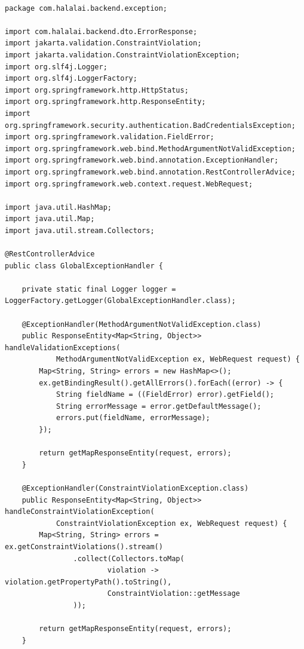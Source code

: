 \begin{lstlisting}[basicstyle=\tiny\ttfamily,breaklines=true]

package com.halalai.backend.exception;

import com.halalai.backend.dto.ErrorResponse;
import jakarta.validation.ConstraintViolation;
import jakarta.validation.ConstraintViolationException;
import org.slf4j.Logger;
import org.slf4j.LoggerFactory;
import org.springframework.http.HttpStatus;
import org.springframework.http.ResponseEntity;
import org.springframework.security.authentication.BadCredentialsException;
import org.springframework.validation.FieldError;
import org.springframework.web.bind.MethodArgumentNotValidException;
import org.springframework.web.bind.annotation.ExceptionHandler;
import org.springframework.web.bind.annotation.RestControllerAdvice;
import org.springframework.web.context.request.WebRequest;

import java.util.HashMap;
import java.util.Map;
import java.util.stream.Collectors;

@RestControllerAdvice
public class GlobalExceptionHandler {

    private static final Logger logger = LoggerFactory.getLogger(GlobalExceptionHandler.class);

    @ExceptionHandler(MethodArgumentNotValidException.class)
    public ResponseEntity<Map<String, Object>> handleValidationExceptions(
            MethodArgumentNotValidException ex, WebRequest request) {
        Map<String, String> errors = new HashMap<>();
        ex.getBindingResult().getAllErrors().forEach((error) -> {
            String fieldName = ((FieldError) error).getField();
            String errorMessage = error.getDefaultMessage();
            errors.put(fieldName, errorMessage);
        });

        return getMapResponseEntity(request, errors);
    }

    @ExceptionHandler(ConstraintViolationException.class)
    public ResponseEntity<Map<String, Object>> handleConstraintViolationException(
            ConstraintViolationException ex, WebRequest request) {
        Map<String, String> errors = ex.getConstraintViolations().stream()
                .collect(Collectors.toMap(
                        violation -> violation.getPropertyPath().toString(),
                        ConstraintViolation::getMessage
                ));

        return getMapResponseEntity(request, errors);
    }


\end{lstlisting}
